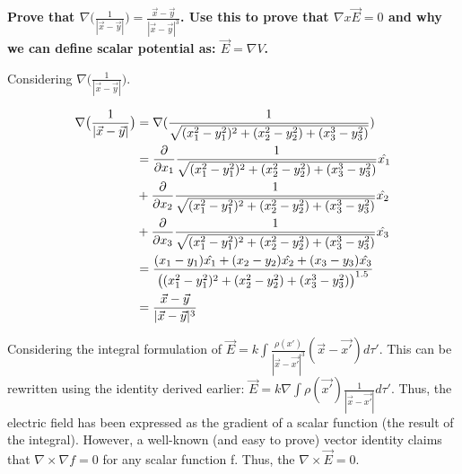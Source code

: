 \begin{homeworkProblem}

\textbf{Prove that $\nabla \big( \frac{1}{|\vec{x}-\vec{y}|}\big) = \frac{\vec{x}-\vec{y}}{|\vec{x}-\vec{y}|^3}$. Use this to prove that $\nabla x \vec{E} = 0$ and why we can define scalar potential as: $\vec{E} = \nabla V$.}

Considering $\nabla \big( \frac{1}{|\vec{x}-\vec{y}|}\big)$.

\begin{align}
\nabla \big( \frac{1}{|\vec{x}-\vec{y}|}\big) &= \nabla( \frac{1}{\sqrt{(x_1^2-y_1^2)^2+(x_2^2-y_2^2)+(x_3^3-y_3^2)}} ) \nonumber \\
&= \dfrac{\partial}{\partial x_1}  \frac{1}{\sqrt{(x_1^2-y_1^2)^2+(x_2^2-y_2^2)+(x_3^3-y_3^2)}}\hat{x_1} \nonumber \\ & + \dfrac{\partial}{\partial x_2}\frac{1}{\sqrt{(x_1^2-y_1^2)^2+(x_2^2-y_2^2)+(x_3^3-y_3^2)}}\hat{x_2} \nonumber \\ &+ \dfrac{\partial}{\partial x_3}  \frac{1}{\sqrt{(x_1^2-y_1^2)^2+(x_2^2-y_2^2)+(x_3^3-y_3^2)}}\hat{x_3} \nonumber \\
&= \frac{(x_1 - y_1)\hat{x_1} + (x_2 - y_2) \hat{x_2} + (x_3 - y_3) \hat{x_3}}{\big((x_1^2-y_1^2)^2+(x_2^2-y_2^2)+(x_3^3-y_3^2)\big)^{1.5}} \nonumber \\
&= \frac{\vec{x}-\vec{y}}{|\vec{x}-\vec{y}|^3} \nonumber
\end{align}

Considering the integral formulation of $\vec{E} = k \int \frac{\rho(x')}{|\vec{x}-\vec{x'}|^3}(\vec{x}-\vec{x'})d\tau'$. This can be rewritten using the identity derived earlier: $\vec{E} = k \nabla \int \rho(\vec{x'})\frac{1}{|\vec{x}-\vec{x'}|} d\tau'$. Thus, the electric field has been expressed as the gradient of a scalar function (the result of the integral). However, a well-known (and easy to prove) vector identity claims that $\nabla \times \nabla f = 0$ for any scalar function f. Thus, the $\nabla \times \vec{E} = 0$.

\end{homeworkProblem}